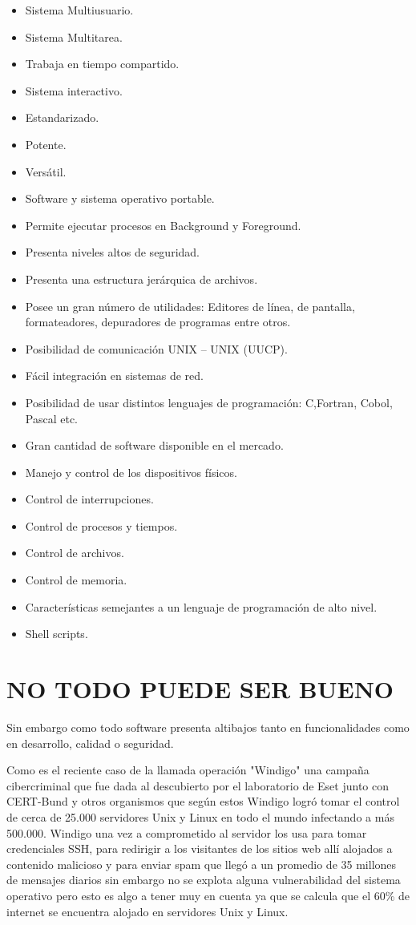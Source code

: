 \begin{itemize}
	\item Sistema Multiusuario.
	\item Sistema Multitarea.
	\item Trabaja en tiempo compartido.
	\item Sistema interactivo.
	\item Estandarizado.
	\item Potente.
	\item Versátil.
	\item Software y sistema operativo portable.
	\item Permite ejecutar procesos en Background y Foreground.
	\item Presenta niveles altos de seguridad.
	\item Presenta una estructura jerárquica de archivos.
	\item Posee un gran número de utilidades: Editores de línea, de pantalla, formateadores, depuradores de programas entre otros.
	\item Posibilidad de comunicación UNIX – UNIX (UUCP).
	\item Fácil integración en sistemas de red.
	\item Posibilidad de usar distintos lenguajes de programación: C,Fortran, Cobol, Pascal etc.
	\item Gran cantidad de software disponible en el mercado.
	\item Manejo y control de los dispositivos físicos.
	\item Control de interrupciones.
	\item Control de procesos y tiempos.
	\item Control de archivos.
	\item Control de memoria.
	\item Características semejantes a un lenguaje de programación de alto nivel.
	\item Shell scripts.

\end{itemize}


\section*{NO TODO PUEDE SER BUENO}
Sin embargo como todo software presenta altibajos tanto en funcionalidades como en desarrollo, calidad o seguridad.
                                           
Como es el reciente caso de la llamada operación "Windigo" una campaña cibercriminal que fue dada al descubierto por el laboratorio de Eset junto con CERT-Bund y otros 
organismos que según estos Windigo logró tomar el control de cerca de 25.000 servidores Unix y Linux en todo el mundo infectando a más 500.000. Windigo una vez a 
comprometido al servidor los usa para tomar credenciales SSH, para redirigir a  los visitantes de los sitios web allí alojados a contenido malicioso  y para enviar spam que 
llegó a un promedio de 35 millones de mensajes diarios sin embargo no se explota alguna vulnerabilidad del sistema operativo pero esto es algo a tener muy en cuenta ya que 
se calcula que el 60\% de internet se encuentra alojado en servidores Unix y Linux.

